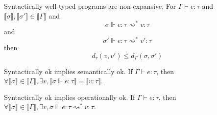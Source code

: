 Syntactically well-typed programs are non-expansive. For $\Gamma \vdash e : \tau
$ and $\llbracket \sigma \rrbracket, \llbracket \sigma' \rrbracket \in
\llbracket \Gamma \rrbracket $ and
$$\sigma \Vdash e : \tau \rightsquigarrow^* v : \tau$$ 
and 
$$\sigma' \Vdash e : \tau \rightsquigarrow^* v' : \tau$$
then
$$
d_{\tau}(v, v') \leq d_{\Gamma}(\sigma, \sigma')
$$

Syntactically ok implies semantically ok. If $\Gamma \vdash e : \tau$, then
$\forall \llbracket \sigma \rrbracket \in \llbracket \Gamma \rrbracket, \exists
v, \llbracket \sigma \Vdash e : \tau \rrbracket = \llbracket v : \tau
\rrbracket$.

Syntactically ok implies operationally ok. If $\Gamma \vdash e : \tau$, then
$\forall \llbracket \sigma \rrbracket \in \llbracket \Gamma \rrbracket, \exists
v, \sigma \Vdash e : \tau \rightsquigarrow^{*} v : \tau$.

